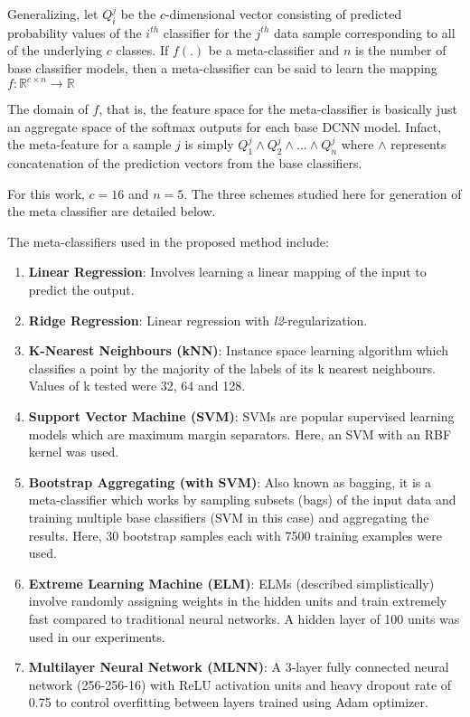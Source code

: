 \documentclass[10pt,conference,a4paper]{IEEEtran}
\begin{document}
Generalizing, let $Q^j_i$ be the $c$-dimensional vector consisting of predicted probability values of the $i^{th}$ classifier for the $j^{th}$ data sample corresponding to all of the underlying $c$ classes. If $f(.)$ be a meta-classifier and $n$ is the number of base classifier models, then a meta-classifier can be said to learn the mapping $ f: \mathbb{R}^{c\times n} \rightarrow \mathbb{R}$

The domain of $f$, that is, the feature space for the meta-classifier is basically just an aggregate space of the softmax outputs for each base DCNN model. Infact, the meta-feature for a sample $j$ is simply $Q^j_1 \wedge Q^j_2 \wedge ... \wedge Q^j_n$ where $\wedge$ represents concatenation of the prediction vectors from the base classifiers.

For this work, $c=16$ and $n=5$. The three schemes studied here for generation of the meta classifier are detailed below.

The meta-classifiers used in the proposed method include:
\begin{enumerate}
	\item \textbf{Linear Regression}: Involves learning a linear mapping of the input to predict the output.
	\item \textbf{Ridge Regression}: Linear regression with \textit{l2}-regularization.
	\item \textbf{K-Nearest Neighbours (kNN)}: Instance space learning algorithm which classifies a point by the majority of the labels of its k nearest neighbours. Values of k tested were 32, 64 and 128.
	\item \textbf{Support Vector Machine (SVM)}: SVMs are popular supervised learning models which are maximum margin separators. Here, an SVM with an RBF kernel was used.
	\item \textbf{Bootstrap Aggregating (with SVM)}: Also known as bagging, it is a meta-classifier which works by sampling subsets (bags) of the input data and training multiple base classifiers (SVM in this case) and aggregating the results. Here, 30 bootstrap samples each with 7500 training examples were used.
	\item \textbf{Extreme Learning Machine (ELM)}: ELMs (described simplistically) involve randomly assigning weights in the hidden units and train extremely fast compared to traditional neural networks. A hidden layer of 100 units was used in our experiments.
	\item \textbf{Multilayer Neural Network (MLNN)}: A 3-layer fully connected neural network (256-256-16) with ReLU activation units and heavy dropout rate of 0.75 to control overfitting between layers trained using Adam optimizer.
\end{enumerate}
\end{document}
